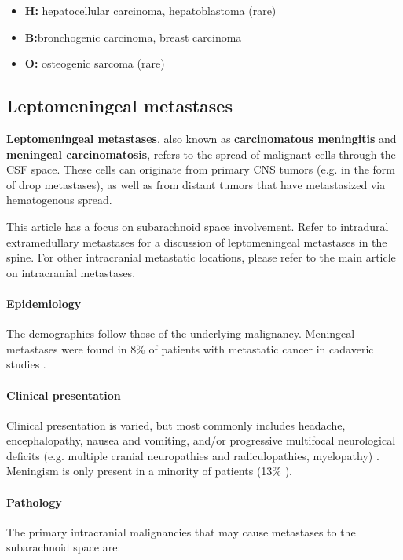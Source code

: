 \begin{itemize}
	\item
	\textbf{H:} hepatocellular carcinoma, hepatoblastoma (rare)
	\item
	\textbf{B:}bronchogenic carcinoma, breast carcinoma
	\item
	\textbf{O:} osteogenic sarcoma (rare)
\end{itemize}
\subsection{Leptomeningeal metastases}

\textbf{Leptomeningeal metastases}, also known as \textbf{carcinomatous meningitis} and \textbf{meningeal carcinomatosis}, refers to the spread of malignant cells through the CSF space. These cells can originate from primary CNS tumors (e.g. in the form of drop metastases), as well as from distant tumors that have metastasized via hematogenous spread.

This article has a focus on subarachnoid space involvement. Refer to intradural extramedullary metastases for a discussion of leptomeningeal metastases in the spine. For other intracranial metastatic locations, please refer to the main article on intracranial metastases.

\paragraph{Epidemiology}

The demographics follow those of the underlying malignancy. Meningeal metastases were found in 8\% of patients with metastatic cancer in cadaveric studies .

\paragraph{Clinical presentation}

Clinical presentation is varied, but most commonly includes headache, encephalopathy, nausea and vomiting, and/or progressive multifocal neurological deficits (e.g. multiple cranial neuropathies and radiculopathies, myelopathy) . Meningism is only present in a minority of patients (13\% ).

\paragraph{Pathology}

The primary intracranial malignancies that may cause metastases to the subarachnoid space are:

